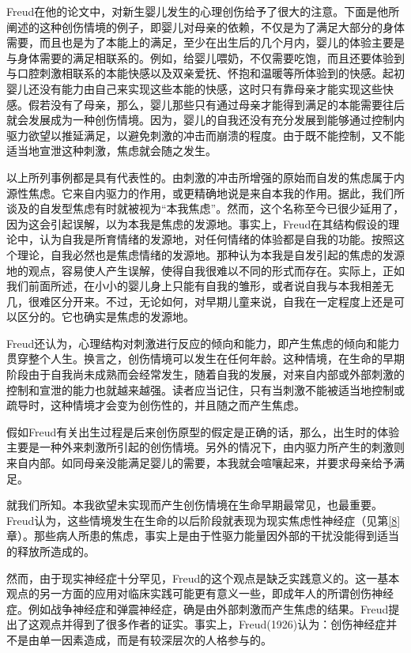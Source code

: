 \documentclass[UTF8,10pt,a4paper,openany]{book}
\begin{document}
Freud在他的论文中，对新生婴儿发生的心理创伤给予了很大的注意。下面是他所阐述的这种创伤情境的例子，即婴儿对母亲的依赖，不仅是为了满足大部分的身体需要，而且也是为了本能上的满足，至少在出生后的几个月内，婴儿的体验主要是与身体需要的满足相联系的。例如，给婴儿喂奶，不仅需要吃饱，而且还要体验到与口腔刺激相联系的本能快感以及双亲爱抚、怀抱和温暖等所体验到的快感。起初婴儿还没有能力由自己来实现这些本能的快感，这时只有靠母亲才能实现这些快感。假若没有了母亲，那么，婴儿那些只有通过母亲才能得到满足的本能需要往后就会发展成为一种创伤情境。因为，婴儿的自我还没有充分发展到能够通过控制内驱力欲望以推延满足，以避免刺激的冲击而崩溃的程度。由于既不能控制，又不能适当地宣泄这种刺激，焦虑就会随之发生。

以上所列事例都是具有代表性的。由刺激的冲击所增强的原始而自发的焦虑属于内源性焦虑。它来自内驱力的作用，或更精确地说是来自本我的作用。据此，我们所谈及的自发型焦虑有时就被视为“本我焦虑”。然而，这个名称至今已很少延用了，因为这会引起误解，以为本我是焦虑的发源地。事实上，Freud在其结构假设的理论中，认为自我是所育情绪的发源地，对任何情绪的体验都是自我的功能。按照这个理论，自我必然也是焦虑情绪的发源地。那种认为本我是自发引起的焦虑的发源地的观点，容易使人产生误解，使得自我很难以不同的形式而存在。实际上，正如我们前面所述，在小小的婴儿身上只能有自我的雏形，或者说自我与本我相差无几，很难区分开来。不过，无论如何，对早期儿童来说，自我在一定程度上还是可以区分的。它也确实是焦虑的发源地。

Freud还认为，心理结构对刺激进行反应的倾向和能力，即产生焦虑的倾向和能力贯穿整个人生。换言之，创伤情境可以发生在任何年龄。这种情境，在生命的早期阶段由于自我尚未成熟而会经常发生，随着自我的发展，对来自内部或外部刺激的控制和宣泄的能力也就越来越强。读者应当记住，只有当刺激不能被适当地控制或疏导时，这种情境才会变为创伤性的，并且随之而产生焦虑。

假如Freud有关出生过程是后来创伤原型的假定是正确的话，那么，出生时的体验主要是一种外来刺激所引起的创伤情境。另外的情况下，由内驱力所产生的刺激则来自内部。如同母亲没能满足婴儿的需要，本我就会喧嚷起来，并要求母亲给予满足。

就我们所知。本我欲望未实现而产生创伤情境在生命早期最常见，也最重要。Freud认为，这些情境发生在生命的以后阶段就表现为现实焦虑性神经症（见第\ref{8}章）。那些病人所患的焦虑，事实上是由于性驱力能量因外部的干扰没能得到适当的释放所造成的。

然而，由于现实神经症十分罕见，Freud的这个观点是缺乏实践意义的。这一基本观点的另一方面的应用对临床实践可能更有意义一些，即成年人的所谓创伤神经症。例如战争神经症和弹震神经症，确是由外部刺激而产生焦虑的结果。Freud提出了这观点并得到了很多作者的证实。事实上，Freud(1926)认为：创伤神经症并不是由单一因素造成，而是有较深层次的人格参与的。
\end{document}
